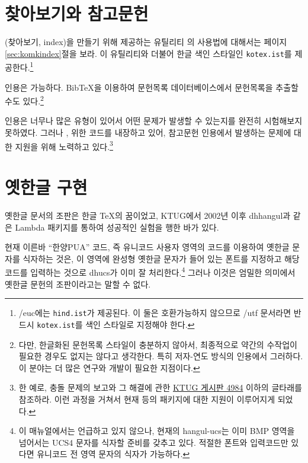 \section{찾아보기와 참고문헌}

(찾아보기, index)을 만들기 위해 제공하는 유틸리티
의 사용법에 대해서는 \pageref{sec:komkindex}
페이지 \ref{sec:komkindex}절을 보라. 이 유틸리티와 더불어
한글 색인 스타일인 \verb|kotex.ist|를 제공한다.\footnote{%
  \kotex/euc에는 \texttt{hind.ist}가 제공된다.
  이 둘은 호환가능하지 않으므로 \kotex/utf 문서라면
  반드시 \texttt{kotex.ist}를 색인 스타일로 지정해야 한다.}

 인용은 가능하다. Bib\TeX 을 이용하여
문헌목록 데이터베이스에서 문헌목록을 추출할 수도 있다.\footnote{%
  다만, 한글화된 문헌목록 스타일이 충분하지 않아서,
  최종적으로 약간의 수작업이 필요한 경우도 없지는 않다고 생각한다.
  특히 저자-연도 방식의 인용에서 그러하다. 이 분야는
  더 많은 연구와 개발이 필요한 지점이다.}



 인용은 너무나 많은 유형이 있어서 어떤
문제가 발생할 수 있는지를 완전히 시험해보지 못하였다.
그러나 , \와 \을 위한
코드를 내장하고 있어, 참고문헌 인용에서 발생하는 문제에 대한
지원을 위해 노력하고 있다.\footnote{%
  한 예로,  충돌 문제의 보고와 그 해결에 관한
  \href{http://www.ktug.or.kr/jsboard/read.php?table=operate&no=21183}{KTUG 게시판 4984}
  이하의 글타래를 참조하라. 이런 과정을 거쳐서 현재
   등의 패키지에 대한 지원이 이루어지게 되었다.}

\section{옛한글 구현}

옛한글 문서의 조판은 한글 \TeX 의 꿈이었고, KTUG에서 2002년 이후
dhhangul과 같은 Lambda 패키지를 통하여 성공적인 실험을 행한 바가
있다.

현재 이른바 ``한양PUA'' 코드, 즉 유니코드 사용자 영역의 코드를 이용하여
옛한글 문자를 식자하는 것은, 이 영역에 완성형 옛한글 문자가 들어 있는
폰트를 지정하고 해당 코드를 입력하는 것으로 dhucs가 이미
잘 처리한다.\footnote{%
  이 매뉴얼에서는 언급하고 있지 않으나, 현재의 hangul-ucs는
  이미 BMP 영역을 넘어서는 UCS4 문자를 식자할 준비를 갖추고
  있다. 적절한 폰트와 입력코드만 있다면 유니코드 전 영역 문자의
  식자가 가능하다.}
그러나 이것은 엄밀한 의미에서 옛한글 문헌의 조판이라고는 말할 수 
없다.

